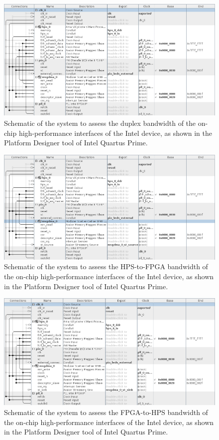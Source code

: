 \begin{figure}[!b]
    \centering
    \includegraphics[width=\linewidth]{figures/intel_duplex.png}
    \caption{Schematic of the system to assess the duplex bandwidth of the on-chip high-performance interfaces of the Intel device, as shown in the Platform Designer tool of Intel Quartus Prime.}
    \label{fig:intel_duplex}
\end{figure}

\begin{figure}[!t]
    \centering
    \includegraphics[width=\linewidth]{figures/intel_h2f.png}
    \caption{Schematic of the system to assess the \ac{HPS}-to-\ac{FPGA} bandwidth of the on-chip high-performance interfaces of the Intel device, as shown in the Platform Designer tool of Intel Quartus Prime.}
    \label{fig:intel_h2f}
\end{figure}

\begin{figure}[!t]
    \centering
    \includegraphics[width=\linewidth]{figures/intel_f2h.png}
    \caption{Schematic of the system to assess the \ac{FPGA}-to-\ac{HPS} bandwidth of the on-chip high-performance interfaces of the Intel device, as shown in the Platform Designer tool of Intel Quartus Prime.}
    \label{fig:intel_f2h}
\end{figure}

